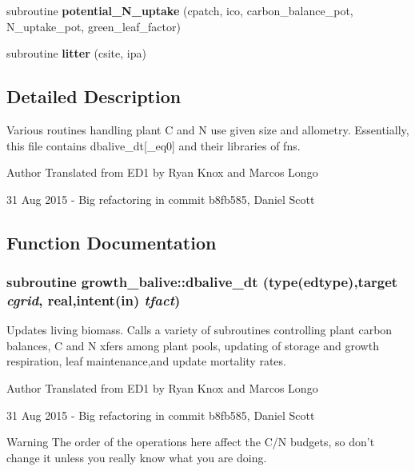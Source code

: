 \begin{DoxyCompactItemize}
\item 
\hypertarget{namespacegrowth__balive_acf79474af61cf55cda65a317af916dc8}{
subroutine {\bfseries potential\_\-N\_\-uptake} (cpatch, ico, carbon\_\-balance\_\-pot, N\_\-uptake\_\-pot, green\_\-leaf\_\-factor)}
\label{namespacegrowth__balive_acf79474af61cf55cda65a317af916dc8}

\item 
\hypertarget{namespacegrowth__balive_affc86c9f292d8fa6d67dfe1d0df69337}{
subroutine {\bfseries litter} (csite, ipa)}
\label{namespacegrowth__balive_affc86c9f292d8fa6d67dfe1d0df69337}

\end{DoxyCompactItemize}


\subsection{Detailed Description}
Various routines handling plant C and N use given size and allometry. Essentially, this file contains dbalive\_\-dt\mbox{[}\_\-eq0\mbox{]} and their libraries of fns. \begin{DoxyAuthor}{Author}
Translated from ED1 by Ryan Knox and Marcos Longo 

31 Aug 2015 -\/ Big refactoring in commit b8fb585, Daniel Scott 
\end{DoxyAuthor}


\subsection{Function Documentation}
\hypertarget{namespacegrowth__balive_a7781ae229b2399c90d50858382665ee8}{
\subsubsection[{dbalive\_\-dt}]{\setlength{\rightskip}{0pt plus 5cm}subroutine growth\_\-balive::dbalive\_\-dt (type({\bf edtype}),target {\em cgrid}, \/  real,intent(in) {\em tfact})}}
\label{namespacegrowth__balive_a7781ae229b2399c90d50858382665ee8}


Updates living biomass. Calls a variety of subroutines controlling plant carbon balances, C and N xfers among plant pools, updating of storage and growth respiration, leaf maintenance,and update mortality rates. \begin{DoxyAuthor}{Author}
Translated from ED1 by Ryan Knox and Marcos Longo 

31 Aug 2015 -\/ Big refactoring in commit b8fb585, Daniel Scott 
\end{DoxyAuthor}
\begin{DoxyWarning}{Warning}
The order of the operations here affect the C/N budgets, so don't change it unless you really know what you are doing. 
\end{DoxyWarning}

